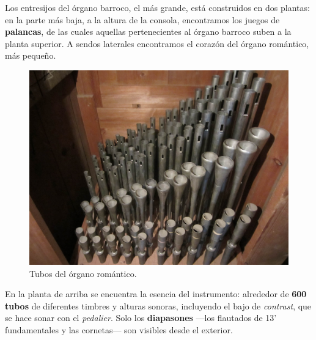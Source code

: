 \smallskip

Los entresijos del órgano barroco, el más grande, está construidos en dos plantas: en la parte más baja, a la altura de la consola, encontramos los juegos de \textbf{palancas}, de las cuales aquellas pertenecientes al órgano barroco suben a la planta superior. A sendos laterales encontramos el corazón del órgano romántico, más pequeño.

\smallskip

\begin{figure}[H]
	\noindent \begin{centering}
		\includegraphics[width=\linewidth*3/4]{capitulo3/romantico}
		\par\end{centering}
	\smallskip
	\caption{\label{fig:romantico} Tubos del órgano romántico.}
\end{figure} 

\smallskip

En la planta de arriba se encuentra la esencia del instrumento: alrededor de \textbf{600 tubos} de diferentes timbres y alturas sonoras, incluyendo el bajo de \textit{contrast}, que se hace sonar con el \textit{pedalier}. Solo los \textbf{diapasones} ---los flautados de 13' fundamentales y las cornetas--- son visibles desde el exterior.

\smallskip

